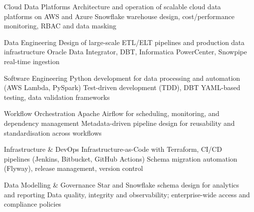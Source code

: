 

\begin{cvskillsnoncentered}

  \cvskill
{Cloud Data Platforms}
{Architecture and operation of scalable cloud data platforms on AWS and Azure}
\cvskill
{}
{Snowflake warehouse design, cost/performance monitoring, RBAC and data masking}

\cvskill
{Data Engineering}
{Design of large-scale ETL/ELT pipelines and production data infrastructure}
\cvskill
{}
{Oracle Data Integrator, DBT, Informatica PowerCenter, Snowpipe real-time ingestion}

\cvskill
{Software Engineering}
{Python development for data processing and automation (AWS Lambda, PySpark)}
\cvskill
{}
{Test-driven development (TDD), DBT YAML-based testing, data validation frameworks}

\cvskill
{Workflow Orchestration}
{Apache Airflow for scheduling, monitoring, and dependency management}
\cvskill
{}
{Metadata-driven pipeline design for reusability and standardisation across workflows}

\cvskill
{Infrastructure \& DevOps}
{Infrastructure-as-Code with Terraform, CI/CD pipelines (Jenkins, Bitbucket, GitHub Actions)}
\cvskill
{}
{Schema migration automation (Flyway), release management, version control}

\cvskill
{Data Modelling \& Governance}
{Star and Snowflake schema design for analytics and reporting}
\cvskill
{}
{Data quality, integrity and observability; enterprise-wide access and compliance policies}

\end{cvskillsnoncentered}